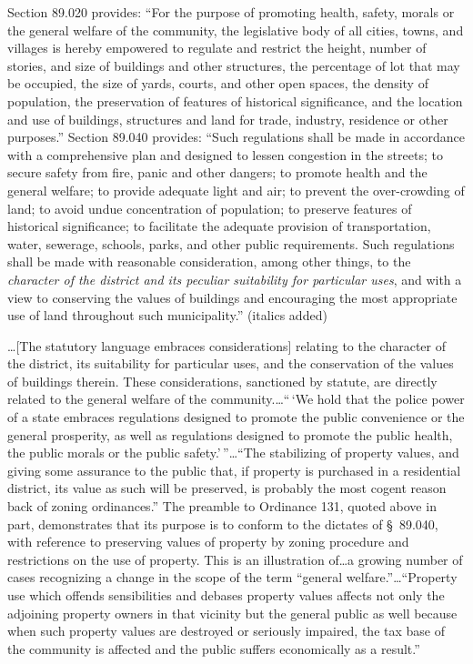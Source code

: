 Section 89.020 provides: ``For the purpose of promoting health, safety, morals
or the general welfare of the community, the legislative body of all cities,
towns, and villages is hereby empowered to regulate and restrict the height,
number of stories, and size of buildings and other structures, the percentage of
lot that may be occupied, the size of yards, courts, and other open spaces, the
density of population, the preservation of features of historical significance,
and the location and use of buildings, structures and land for trade, industry,
residence or other purposes.'' Section 89.040 provides: ``Such regulations shall
be made in accordance with a comprehensive plan and designed to lessen
congestion in the streets; to secure safety from fire, panic and other dangers;
to promote health and the general welfare; to provide adequate light and air; to
prevent the over-crowding of land; to avoid undue concentration of population;
to preserve features of historical significance; to facilitate the adequate
provision of transportation, water, sewerage, schools, parks, and other public
requirements. Such regulations shall be made with reasonable consideration,
among other things, to the \textit{character of the district and its peculiar
suitability for particular uses}, and with a view to conserving the values of
buildings and encouraging the most appropriate use of land throughout such
municipality.'' (italics added)

\ldots [The statutory language embraces considerations] relating to the
character of the district, its suitability for particular uses, and the
conservation of the values of buildings therein. These considerations,
sanctioned by statute, are directly related to the general welfare of the
community.\ldots ``\,`We hold that the police power of a state embraces
regulations designed to promote the public convenience or the general
prosperity, as well as regulations designed to promote the public health, the
public morals or the public safety.'\,''\ldots ``The stabilizing of property
values, and giving some assurance to the public that, if property is purchased
in a residential district, its value as such will be preserved, is probably the
most cogent reason back of zoning ordinances.'' The preamble to Ordinance 131,
quoted above in part, demonstrates that its purpose is to conform to the
dictates of \S~89.040, with reference to preserving values of property by zoning
procedure and restrictions on the use of property. This is an illustration
of\ldots a growing number of cases recognizing a change in the scope of the term
``general welfare.''\ldots ``Property use which offends sensibilities and
debases property values affects not only the adjoining property owners in that
vicinity but the general public as well because when such property values are
destroyed or seriously impaired, the tax base of the community is affected and
the public suffers economically as a result.''

